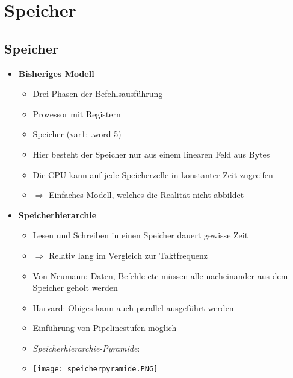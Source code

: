 \section{Speicher}
\subsection{Speicher}

    \begin{itemize}
        \item \textbf{Bisheriges Modell}
            \begin{itemize}
                \item Drei Phasen der Befehlsausführung
                \item Prozessor mit Registern
                \item Speicher (var1: .word 5)
                \item Hier besteht der Speicher nur aus einem linearen Feld aus Bytes
                \item Die CPU kann auf jede Speicherzelle in konstanter Zeit zugreifen
                \item[] $\Rightarrow$ Einfaches Modell, welches die Realität nicht abbildet
            \end{itemize}
        
        \item \textbf{Speicherhierarchie}
            \begin{itemize}
                \item Lesen und Schreiben in einen Speicher dauert gewisse Zeit
                \item[] $\Rightarrow$ Relativ lang im Vergleich zur Taktfrequenz
                \item Von-Neumann: Daten, Befehle etc müssen alle nacheinander aus dem Speicher geholt werden
                \item Harvard: Obiges kann auch parallel ausgeführt werden
                \item Einführung von Pipelinestufen möglich
                \item \textit{Speicherhierarchie-Pyramide}:
                \item[] \texttt{[image: speicherpyramide.PNG]} 
            \end{itemize}


\end{itemize}
